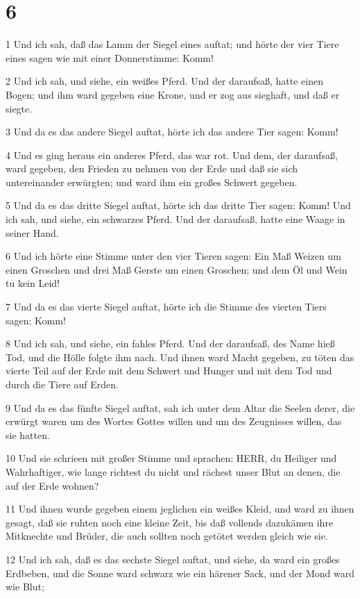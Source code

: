 \chapter{6}

\par 1 Und ich sah, daß das Lamm der Siegel eines auftat; und hörte der vier Tiere eines sagen wie mit einer Donnerstimme: Komm!
\par 2 Und ich sah, und siehe, ein weißes Pferd. Und der daraufsaß, hatte einen Bogen; und ihm ward gegeben eine Krone, und er zog aus sieghaft, und daß er siegte.
\par 3 Und da es das andere Siegel auftat, hörte ich das andere Tier sagen: Komm!
\par 4 Und es ging heraus ein anderes Pferd, das war rot. Und dem, der daraufsaß, ward gegeben, den Frieden zu nehmen von der Erde und daß sie sich untereinander erwürgten; und ward ihm ein großes Schwert gegeben.
\par 5 Und da es das dritte Siegel auftat, hörte ich das dritte Tier sagen: Komm! Und ich sah, und siehe, ein schwarzes Pferd. Und der daraufsaß, hatte eine Waage in seiner Hand.
\par 6 Und ich hörte eine Stimme unter den vier Tieren sagen: Ein Maß Weizen um einen Groschen und drei Maß Gerste um einen Groschen; und dem Öl und Wein tu kein Leid!
\par 7 Und da es das vierte Siegel auftat, hörte ich die Stimme des vierten Tiers sagen: Komm!
\par 8 Und ich sah, und siehe, ein fahles Pferd. Und der daraufsaß, des Name hieß Tod, und die Hölle folgte ihm nach. Und ihnen ward Macht gegeben, zu töten das vierte Teil auf der Erde mit dem Schwert und Hunger und mit dem Tod und durch die Tiere auf Erden.
\par 9 Und da es das fünfte Siegel auftat, sah ich unter dem Altar die Seelen derer, die erwürgt waren um des Wortes Gottes willen und um des Zeugnisses willen, das sie hatten.
\par 10 Und sie schrieen mit großer Stimme und sprachen: HERR, du Heiliger und Wahrhaftiger, wie lange richtest du nicht und rächest unser Blut an denen, die auf der Erde wohnen?
\par 11 Und ihnen wurde gegeben einem jeglichen ein weißes Kleid, und ward zu ihnen gesagt, daß sie ruhten noch eine kleine Zeit, bis daß vollends dazukämen ihre Mitknechte und Brüder, die auch sollten noch getötet werden gleich wie sie.
\par 12 Und ich sah, daß es das sechste Siegel auftat, und siehe, da ward ein großes Erdbeben, und die Sonne ward schwarz wie ein härener Sack, und der Mond ward wie Blut;
